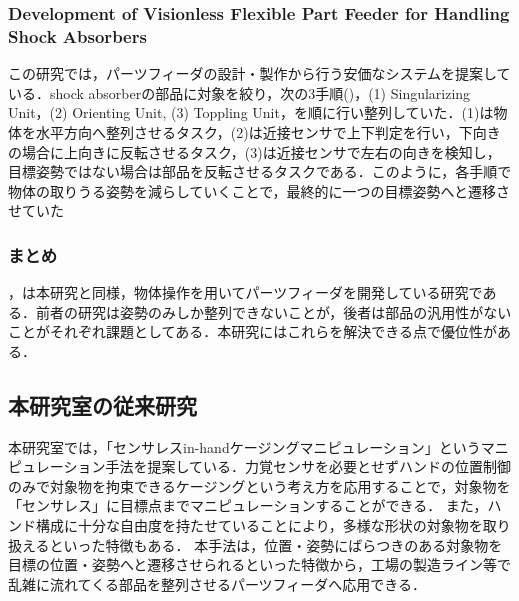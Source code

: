 \documentclass[a4paper,twoside,12pt,papersize, dvipdfmx]{iirthesis}
\begin{document}
\subsubsection{Development of Visionless Flexible Part Feeder for Handling Shock Absorbers \cite{udhayakumar2021}}
この研究では，パーツフィーダの設計・製作から行う安価なシステムを提案している．shock absorberの部品に対象を絞り，次の3手順()，(1) Singularizing Unit，(2) Orienting Unit, (3) Toppling Unit，を順に行い整列していた．(1)は物体を水平方向へ整列させるタスク，(2)は近接センサで上下判定を行い，下向きの場合に上向きに反転させるタスク，(3)は近接センサで左右の向きを検知し，目標姿勢ではない場合は部品を反転させるタスクである．このように，各手順で物体の取りうる姿勢を減らしていくことで，最終的に一つの目標姿勢へと遷移させていた


\subsubsection{まとめ}
\cite{akella2000}，\cite{udhayakumar2021}は本研究と同様，物体操作を用いてパーツフィーダを開発している研究である．前者の研究は姿勢のみしか整列できないことが，後者は部品の汎用性がないことがそれぞれ課題としてある．本研究にはこれらを解決できる点で優位性がある．

\subsection{本研究室の従来研究}
本研究室では，「センサレスin-handケージングマニピュレーション」というマニピュレーション手法を提案している．力覚センサを必要とせずハンドの位置制御のみで対象物を拘束できるケージングという考え方を応用することで，対象物を「センサレス」に目標点までマニピュレーションすることができる．
また，ハンド構成に十分な自由度を持たせていることにより，多様な形状の対象物を取り扱えるといった特徴もある．
本手法は，位置・姿勢にばらつきのある対象物を目標の位置・姿勢へと遷移させられるといった特徴から，工場の製造ライン等で乱雑に流れてくる部品を整列させるパーツフィーダへ応用できる．
\end{document}
